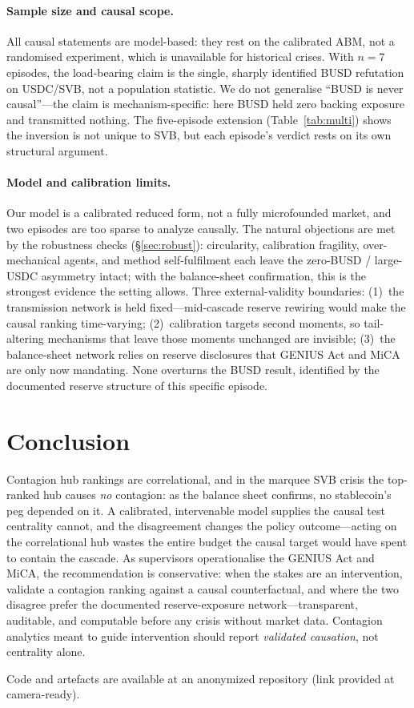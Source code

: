 \documentclass[sigconf,anonymous]{acmart}
\begin{document}
\paragraph{Sample size and causal scope.}
All causal statements are model-based: they rest on the calibrated ABM, not a randomised experiment,
which is unavailable for historical crises. With $n=7$ episodes, the load-bearing claim is the single,
sharply identified BUSD refutation on USDC/SVB, not a population statistic. We do not generalise
``BUSD is never causal''---the claim is mechanism-specific: here BUSD held zero backing exposure and
transmitted nothing. The five-episode extension (Table~\ref{tab:multi}) shows the inversion is not
unique to SVB, but each episode's verdict rests on its own structural argument.
\paragraph{Model and calibration limits.}
Our model is a calibrated reduced form, not a fully microfounded market, and two episodes are
too sparse to analyze causally. The natural objections are met by the robustness checks
(\S\ref{sec:robust}): circularity, calibration fragility, over-mechanical agents, and method
self-fulfilment each leave the zero-BUSD / large-USDC asymmetry intact; with the balance-sheet
confirmation, this is the strongest evidence the setting allows.
Three external-validity boundaries: (1)~the transmission network is held fixed---mid-cascade reserve
rewiring would make the causal ranking time-varying; (2)~calibration targets second moments, so
tail-altering mechanisms that leave those moments unchanged are invisible; (3)~the balance-sheet
network relies on reserve disclosures that GENIUS Act and MiCA are only now mandating. None
overturns the BUSD result, identified by the documented reserve structure of this specific episode.

\section{Conclusion}
Contagion hub rankings are correlational, and in the marquee SVB crisis the top-ranked hub causes
\emph{no} contagion: as the balance sheet confirms, no stablecoin's peg depended on it. A
calibrated, intervenable model supplies the causal test centrality cannot, and the disagreement
changes the policy outcome---acting on the correlational hub wastes the entire budget the causal
target would have spent to contain the cascade. As supervisors operationalise the GENIUS Act and
MiCA, the recommendation is conservative: when the stakes are an intervention, validate a contagion
ranking against a causal counterfactual, and where the two disagree prefer the documented
reserve-exposure network---transparent, auditable, and computable before any crisis without market
data. Contagion analytics meant to guide intervention should report \emph{validated causation}, not
centrality alone.

\begin{acks}
Code and artefacts are available at an anonymized repository (link provided at camera-ready).
\end{acks}

{\footnotesize\setlength{\bibsep}{0pt plus 0.1ex}%
%
}
\end{document}
